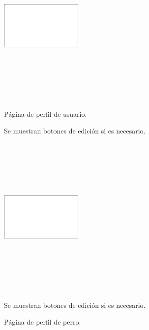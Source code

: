 \documentclass[a4paper, 12pt]{article}
\begin{document}
\begin{figure}[H]
   	\begin{minipage}{0.48\textwidth}
		\begin{center}
			{\includegraphics[height=8cm, width=4cm]{White.png}\par}
			\caption{Página de perfil de usuario.}
			\medskip
			\small
			Se muestran botones de edición si es necesario.
		\end{center}  
	\end{minipage}\hfill
   	\begin{minipage}{0.48\textwidth}
		\begin{center}
			{\includegraphics[height=8cm, width=4cm]{White.png}\par}
			\caption{Página de perfil de perro. }
			\medskip
			\small
			Se muestran botones de edición si es necesario.
		\end{center}  
	\end{minipage}\hfill
\end{figure}
\end{document}
